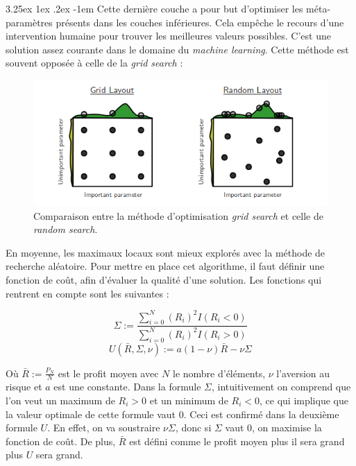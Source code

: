 \documentclass[a4paper, 11pt]{article}
\makeatletter
\renewcommand\paragraph{\@startsection{paragraph}{5}{\z@}%
  {3.25ex \@plus1ex \@minus.2ex}%
  {-1em}%
  {\normalfont\normalsize\bfseries}}
\makeatother
\begin{document}
\paragraph{}
Cette dernière couche a pour but d'optimiser les méta-paramètres présents dans les couches inférieures. Cela empêche le recours d'une intervention
humaine pour trouver les meilleures valeurs possibles. C'est une solution assez courante dans le domaine du \textit{machine learning}\cite{automated_hyperparamters}. Cette méthode est
souvent opposée à celle de la \textit{grid search} \cite{grid_vs_random}:
\begin{figure}[H]
\centering
\includegraphics[scale=0.75]{images/grid_vs_random}
\caption{Comparaison entre la méthode d'optimisation \textit{grid search} et celle de \textit{random search}.}
\end{figure}

En moyenne, les maximaux locaux sont mieux explorés avec la méthode de recherche aléatoire. Pour mettre en place cet algorithme, il faut définir une
fonction de coût, afin d'évaluer la qualité d'une solution.
Les fonctions qui rentrent en compte sont les suivantes :
\begin{center}
 $$ \Sigma := \frac{\sum_{i=0}^N (R_i)^2 I (R_i < 0)}{\sum_{i=0}^N (R_i)^2 I (R_i > 0)}$$
 $$ U(\bar{R}, \Sigma, \nu) := a (1 - \nu) \bar{R} - \nu \Sigma$$
\end{center}

Où $\bar{R} := \frac{P_N}{N}$ est le profit moyen avec $N$ le nombre d'éléments, $\nu$ l'aversion au risque et $a$ est une constante.
Dans la formule $\Sigma$, intuitivement on comprend que l'on veut un maximum de $R_i > 0$ et un minimum de $R_i < 0$, ce qui implique que la valeur
optimale de cette formule vaut $0$. Ceci est confirmé dans la deuxième formule $U$. En effet, on va soustraire $\nu \Sigma$, donc si $\Sigma$ vaut $0$,
on maximise la fonction de coût. De plus, $\bar{R}$ est défini comme le profit moyen plus il sera grand plus $U$ sera grand.
\end{document}
